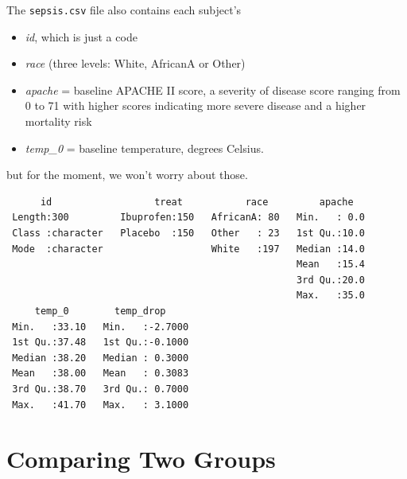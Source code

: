 \documentclass[
]{book}
\newenvironment{Shaded}{\begin{snugshade}}{\end{snugshade}}
\newcommand{\DataTypeTok}[1]{\textcolor[rgb]{0.13,0.29,0.53}{#1}}
\newcommand{\KeywordTok}[1]{\textcolor[rgb]{0.13,0.29,0.53}{\textbf{#1}}}
\newcommand{\NormalTok}[1]{#1}
\newcommand{\OperatorTok}[1]{\textcolor[rgb]{0.81,0.36,0.00}{\textbf{#1}}}
\newcommand{\StringTok}[1]{\textcolor[rgb]{0.31,0.60,0.02}{#1}}
\providecommand{\tightlist}{%
  \setlength{\itemsep}{0pt}\setlength{\parskip}{0pt}}
\begin{document}
The \texttt{sepsis.csv} file also contains each subject's

\begin{itemize}
\tightlist
\item
  \emph{id}, which is just a code
\item
  \emph{race} (three levels: White, AfricanA or Other)
\item
  \emph{apache} = baseline APACHE II score, a severity of disease score ranging from 0 to 71 with higher scores indicating more severe disease and a higher mortality risk
\item
  \emph{temp\_0} = baseline temperature, degrees Celsius.
\end{itemize}

but for the moment, we won't worry about those.

\begin{Shaded}
\end{Shaded}

\begin{verbatim}
      id                  treat           race         apache    
 Length:300         Ibuprofen:150   AfricanA: 80   Min.   : 0.0  
 Class :character   Placebo  :150   Other   : 23   1st Qu.:10.0  
 Mode  :character                   White   :197   Median :14.0  
                                                   Mean   :15.4  
                                                   3rd Qu.:20.0  
                                                   Max.   :35.0  
     temp_0        temp_drop      
 Min.   :33.10   Min.   :-2.7000  
 1st Qu.:37.48   1st Qu.:-0.1000  
 Median :38.20   Median : 0.3000  
 Mean   :38.00   Mean   : 0.3083  
 3rd Qu.:38.70   3rd Qu.: 0.7000  
 Max.   :41.70   Max.   : 3.1000  
\end{verbatim}

\hypertarget{comparing-two-groups}{%
\section{Comparing Two Groups}\label{comparing-two-groups}}
\end{document}
